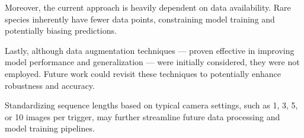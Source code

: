 Moreover, the current approach is heavily dependent on data availability.
Rare species inherently have fewer data points, constraining model training and potentially biasing predictions.

Lastly, although data augmentation techniques --- proven effective in improving model performance and generalization \autocite{shortenSurveyImageData2019} --- were initially considered, they were not employed.
Future work could revisit these techniques to potentially enhance robustness and accuracy.

Standardizing sequence lengths based on typical camera settings, such as 1, 3, 5, or 10 images per trigger, may further streamline future data processing and model training pipelines.
